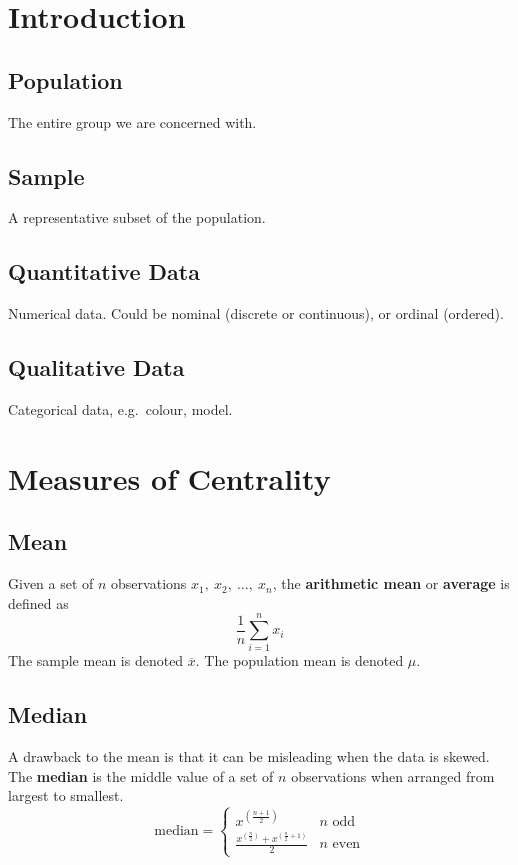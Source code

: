 \documentclass{article}
\begin{document}
\begin{multicols}{3}
    \section{Introduction}
    \subsection{Population}
    The entire group we are concerned with.
    \subsection{Sample}
    A representative subset of the population.
    \subsection{Quantitative Data}
    Numerical data.
    Could be nominal (discrete or continuous), or ordinal (ordered).
    \subsection{Qualitative Data}
    Categorical data, e.g.\ colour, model.

\section{Measures of Centrality}
\subsection{Mean}
Given a set of \(n\) observations \(x_1,\: x_2,\: \ldots,\: x_n\), the \textbf{arithmetic mean}
or \textbf{average} is defined as
\begin{equation*}
    \frac{1}{n} \sum_{i = 1}^n x_i
\end{equation*}
The sample mean is denoted \(\overline{x}\).
The population mean is denoted \(\mu\).
\subsection{Median}
A drawback to the mean is that it can be misleading when the data is skewed.
The \textbf{median} is the middle value of a set of \(n\) observations when arranged
from largest to smallest.
\begin{equation*}
    \text{median} = \begin{cases}
    x^{\left( \frac{n + 1}{2} \right)} & n \text{ odd}
    \\
    \frac{x^{\left( \frac{n}{2} \right)} + x^{\left( \frac{n}{2} + 1 \right)}}{2}
    & n \text{ even}
    \end{cases}
\end{equation*}
\begin{equation*}
\end{equation*}

\end{multicols}
\end{document}
